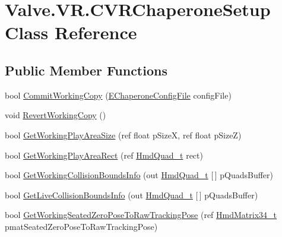\hypertarget{class_valve_1_1_v_r_1_1_c_v_r_chaperone_setup}{}\section{Valve.\+V\+R.\+C\+V\+R\+Chaperone\+Setup Class Reference}
\label{class_valve_1_1_v_r_1_1_c_v_r_chaperone_setup}
\subsection*{Public Member Functions}
\begin{DoxyCompactItemize}
\item 
bool \mbox{\hyperlink{class_valve_1_1_v_r_1_1_c_v_r_chaperone_setup_abb6ee2add41e2ffd400ab355774c7386}{Commit\+Working\+Copy}} (\mbox{\hyperlink{namespace_valve_1_1_v_r_a9d16676419221d1177d39fe862e1f7d1}{E\+Chaperone\+Config\+File}} config\+File)
\item 
void \mbox{\hyperlink{class_valve_1_1_v_r_1_1_c_v_r_chaperone_setup_a45c8a9ccbbb71c1ae5bf3209a4535a2c}{Revert\+Working\+Copy}} ()
\item 
bool \mbox{\hyperlink{class_valve_1_1_v_r_1_1_c_v_r_chaperone_setup_aa43a57c8e233817439f03b5995cfeb98}{Get\+Working\+Play\+Area\+Size}} (ref float p\+SizeX, ref float p\+SizeZ)
\item 
bool \mbox{\hyperlink{class_valve_1_1_v_r_1_1_c_v_r_chaperone_setup_af9818d8196c99c4aa991f53d8571f372}{Get\+Working\+Play\+Area\+Rect}} (ref \mbox{\hyperlink{struct_valve_1_1_v_r_1_1_hmd_quad__t}{Hmd\+Quad\+\_\+t}} rect)
\item 
bool \mbox{\hyperlink{class_valve_1_1_v_r_1_1_c_v_r_chaperone_setup_adc3e926f8a82b9d067f558f843735da7}{Get\+Working\+Collision\+Bounds\+Info}} (out \mbox{\hyperlink{struct_valve_1_1_v_r_1_1_hmd_quad__t}{Hmd\+Quad\+\_\+t}} \mbox{[}$\,$\mbox{]} p\+Quads\+Buffer)
\item 
bool \mbox{\hyperlink{class_valve_1_1_v_r_1_1_c_v_r_chaperone_setup_ae4f63ca66c7798282bc9a2ae79c58d1d}{Get\+Live\+Collision\+Bounds\+Info}} (out \mbox{\hyperlink{struct_valve_1_1_v_r_1_1_hmd_quad__t}{Hmd\+Quad\+\_\+t}} \mbox{[}$\,$\mbox{]} p\+Quads\+Buffer)
\item 
bool \mbox{\hyperlink{class_valve_1_1_v_r_1_1_c_v_r_chaperone_setup_af03bd429f7d5913ca8423ca3cc53dc5d}{Get\+Working\+Seated\+Zero\+Pose\+To\+Raw\+Tracking\+Pose}} (ref \mbox{\hyperlink{struct_valve_1_1_v_r_1_1_hmd_matrix34__t}{Hmd\+Matrix34\+\_\+t}} pmat\+Seated\+Zero\+Pose\+To\+Raw\+Tracking\+Pose)
\item 

\end{DoxyCompactItemize}
